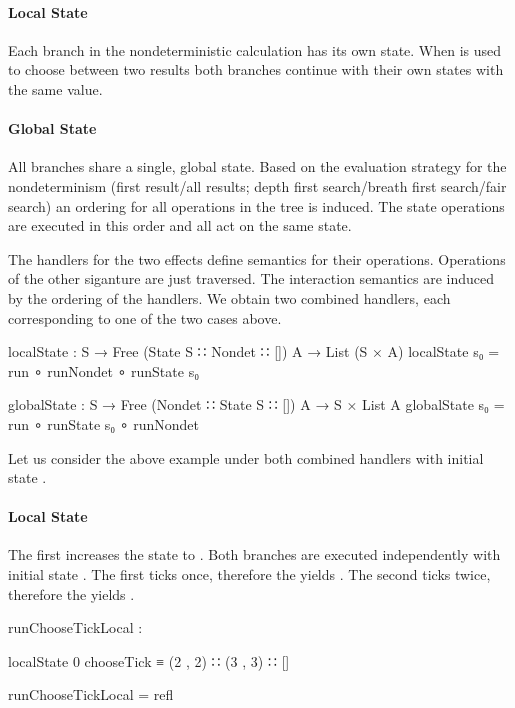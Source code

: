 \paragraph{Local State}
Each branch in the nondeterministic calculation has its own state.
When  is used to choose between two results both branches
continue with their own states with the same value.
\paragraph{Global State}
All branches share a single, global state.
Based on the evaluation strategy for the nondeterminism (first result/all
results; depth first search/breath first search/fair search) an ordering for all
operations in the tree is induced.
The state operations are executed in this order and all act on the same state.

The handlers for the two effects define semantics for their operations.
Operations of the other siganture are just traversed.
The interaction semantics are induced by the ordering of the handlers.
We obtain two combined handlers, each corresponding to one of the two cases
above.

\begin{code}
localState : S → Free (State S ∷ Nondet ∷ []) A → List (S × A)
localState s₀ = run ∘ runNondet ∘ runState s₀

globalState : S → Free (Nondet ∷ State S ∷ []) A → S × List A
globalState s₀ = run ∘ runState s₀ ∘ runNondet
\end{code}
Let us consider the above example under both combined handlers with initial
state .

\paragraph{Local State}
The first  increases the state to .
Both branches are executed independently with initial state .
The first ticks once, therefore the  yields .
The second ticks twice, therefore the  yields .

\begin{center}
\begin{code}
runChooseTickLocal :
\end{code}
\begin{code}[inline]
 localState 0 chooseTick ≡ (2 , 2) ∷ (3 , 3) ∷ []
\end{code}
\begin{code}
runChooseTickLocal = refl
\end{code}
\end{center}

